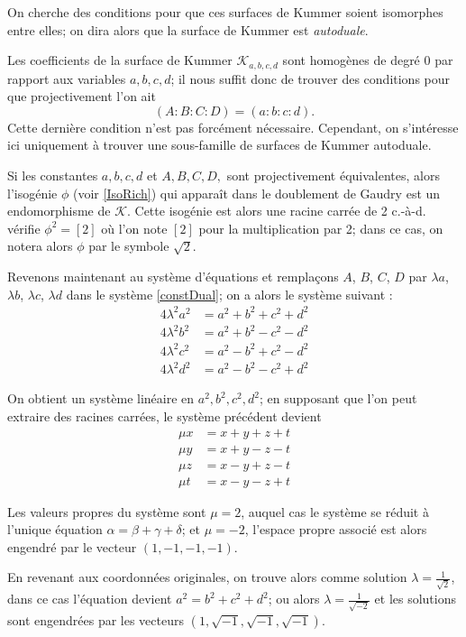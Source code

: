 \documentclass[a4paper,12pt]{article}
\theoremstyle{definition}
\theoremstyle{remark}
\numberwithin{equation}{section}
\begin{document}
On cherche des conditions pour que ces surfaces de Kummer soient isomorphes entre elles; on dira alors que la surface de Kummer est \emph{autoduale}. 

Les coefficients de la surface de Kummer $\mathcal{K}_{a,b,c,d}$ sont homogènes de degré 0 par rapport aux variables $a,b,c,d$; il nous suffit donc de trouver des conditions pour que projectivement l'on ait
$$(A:B:C:D)=(a:b:c:d).$$
Cette dernière condition n'est pas forcément nécessaire. Cependant, on s'intéresse ici uniquement à trouver une sous-famille de surfaces de Kummer autoduale.

Si les constantes $a,b,c,d$ et $A,B,C,D,$ sont projectivement équivalentes, alors l'isogénie $\phi$ (voir \ref{IsoRich}) qui apparaît dans le doublement de Gaudry est un endomorphisme de $\mathcal{K}$. Cette isogénie est alors une racine carrée de 2 c.-à-d. vérifie $\phi^2 = [2]$ où l'on note $[2]$ pour la multiplication par 2; dans ce cas, on notera alors $\phi$ par le symbole $\sqrt{2}$.

Revenons maintenant au système d'équations et remplaçons $A$, $B$, $C$, $D$ par $\lambda a$, $\lambda b$, $\lambda c$, $\lambda d$ dans le système \ref{constDual}; on a alors le système suivant :
\begin{align*}
4\lambda^2a^2 &= a^2 + b^2 + c^2 + d^2 \\
4\lambda^2b^2 &= a^2 + b^2 - c^2 - d^2 \\
4\lambda^2c^2 &= a^2 - b^2 + c^2 - d^2 \\
4\lambda^2d^2 &= a^2 - b^2 - c^2 + d^2
\end{align*}

On obtient un système linéaire en $a^2,b^2,c^2,d^2$; en supposant que l'on peut extraire des racines carrées, le système précédent devient
\begin{align*}
\mu x &= x + y +  z + t \\
\mu y &= x + y -  z - t \\
\mu z &= x - y +  z - t \\
\mu t &= x - y -  z + t
\end{align*}

Les valeurs propres du système sont $\mu = 2$, auquel cas le système se réduit à l'unique équation $\alpha = \beta + \gamma + \delta$; et $\mu = -2$, l'espace propre associé est alors engendré par le vecteur $(1,-1,-1,-1)$.

En revenant aux coordonnées originales, on trouve alors comme solution $\lambda = \frac{1}{\sqrt 2}$, dans ce cas l'équation devient $a^2 = b^2 + c^2 + d^2$; ou alors $\lambda = \frac{1}{\sqrt{-2}}$ et les solutions sont engendrées par les vecteurs $(1,\sqrt{-1},\sqrt{-1},\sqrt{-1})$.
\end{document}
